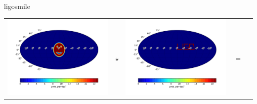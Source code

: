 \documentclass[landscape]{a0poster}
\begin{document}
\begin{staticcontents*}{ligosmile}
\begin{tabular}{ccccc}
	\begin{minipage}[c]{8cm}
		\includegraphics[width=\textwidth]{smile}
	\end{minipage} &
	{\Large$\star$} &
	\begin{minipage}[c]{8cm}
		\includegraphics[width=\textwidth]{ligo}
	\end{minipage} &
	{\Large$=$} &
	\begin{minipage}[c]{8cm}

\end{minipage}
\end{tabular}
\end{staticcontents*}
\end{document}

